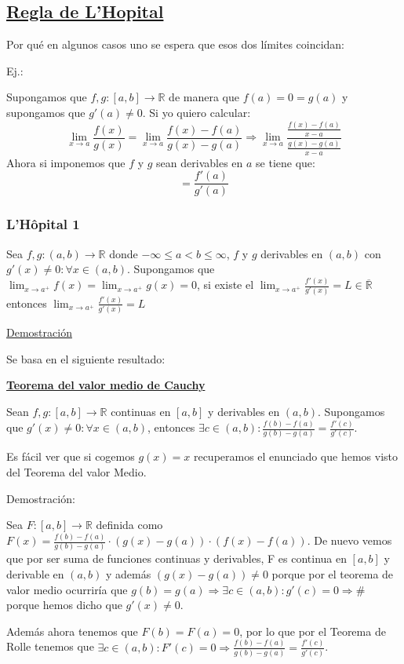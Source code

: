 \documentclass[10pt,a4paper,openright]{book}
\begin{document}
\subsection*{\underline{Regla de L'Hopital}}
Por qué en algunos casos uno se espera que esos dos límites coincidan:

Ej.:

Supongamos que $f,g: [a,b]\rightarrow \mathbb R$ de manera que $f(a)=0=g(a)$ y supongamos que $g'(a)\neq 0$. Si yo quiero calcular:
$$\lim_{x\rightarrow a} \frac{f(x)}{g(x)}=\lim_{x\rightarrow a} \frac{f(x)-f(a)}{g(x)-g(a)}\Rightarrow \lim_{x\rightarrow a}\frac{\frac{f(x)-f(a)}{x-a}}{\frac{g(x)-g(a)}{x-a}}$$
Ahora si imponemos que $f$ y $g$ sean derivables en $a$ se tiene que:
$$=\frac{f'(a)}{g'(a)}$$

\subsubsection*{L'Hôpital 1}
Sea $f,g: (a,b) \rightarrow \mathbb R$ donde $-\infty \leq a < b \leq \infty$, $f$ y $g$ derivables en $(a,b)$ con $g'(x)\neq 0: \forall x\in (a,b)$. Supongamos que $\lim_{x\rightarrow a^+} f(x)=\lim_{x\rightarrow a^+} g(x)=0$, si existe el $\lim_{x\rightarrow a^+} \frac{f'(x)}{g'(x)}=L\in \overline{\mathbb R}$ entonces $\lim_{x\rightarrow a^+}\frac{f'(x)}{g'(x)}=L$

\underline{Demostración}

Se basa en el siguiente resultado:

\underline{\textbf{Teorema del valor medio de Cauchy}}

Sean $f,g: [a,b]\rightarrow \mathbb R$ continuas en $[a,b]$ y derivables en $(a,b)$. Supongamos que $g'(x)\neq 0: \forall x\in (a,b)$, entonces $\exists c\in (a,b): \frac{f(b)-f(a)}{g(b)-g(a)}=\frac{f'(c)}{g'(c)}$.

Es fácil ver que si cogemos $g(x)=x$ recuperamos el enunciado que hemos visto del Teorema del valor Medio.

Demostración:

Sea $F:[a,b]\rightarrow\mathbb R$ definida como $F(x)=\frac{f(b)-f(a)}{g(b)-g(a)}\cdot (g(x)-g(a))\cdot (f(x)-f(a))$. De nuevo vemos que por ser suma de funciones continuas y derivables, F es continua en $[a,b]$ y derivable en $(a,b)$ y además $(g(x)-g(a))\neq 0$ porque por el teorema de valor medio ocurriría que $g(b)=g(a)\Rightarrow \exists c\in  (a,b): g'(c)=0\Rightarrow \#$ porque hemos dicho que $g'(x)\neq 0$.

Además ahora tenemos que $F(b)=F(a)=0$, por lo que por el Teorema de Rolle tenemos que $\exists c \in (a,b): F'(c)=0\Rightarrow \frac{f(b)-f(a)}{g(b)-g(a)}=\frac{f'(c)}{g'(c)}$.
\end{document}
